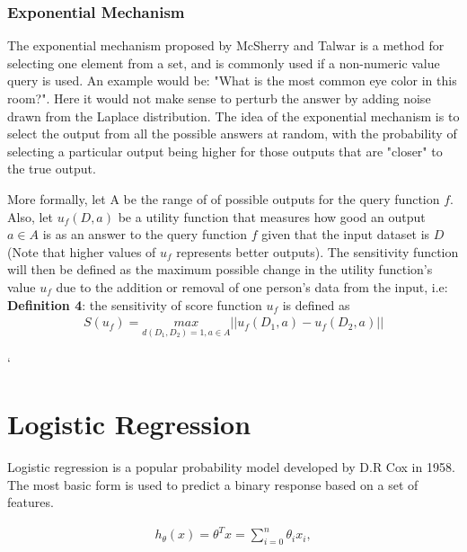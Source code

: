 \subsubsection{Exponential Mechanism}
The exponential mechanism proposed by McSherry and Talwar \cite{mcsherry2007} is a method for selecting one element from a set, and is commonly used if a non-numeric value query is used. An example would be: "What is the most common eye color in this room?". Here it would not make sense to perturb the answer by adding noise drawn from the Laplace distribution. The idea of the exponential mechanism is to select the output from all the possible answers at random, with the probability of selecting a particular output being higher for those outputs that are "closer" to the true output. 

More formally, let A be the range of of possible outputs for the query function $f$. Also, let $u_f(D,a)$ be a utility function that measures how good an output $a\in A$ is as an answer to the query function $f$ given that the input dataset is $D$ (Note that higher values of $u_f$ represents better outputs). The sensitivity function will then be defined as the maximum possible change in the utility function's value $u_f$ due to the addition or removal of one person's data from the input, i.e: \newline
\textbf{Definition 4}: the sensitivity of score function $u_f$ is defined as
\begin{eqnarray} \label{ExpoMecDef}
S(u_f) = \underset{d(D_1,D_2)=1,a\in A}{max}||u_f(D_1, a)-u_f(D_2,a)||
 \end{eqnarray}
 
 `
 \section{Logistic Regression}
 
 Logistic regression is a popular probability model developed by D.R Cox in 1958. The most basic form is used to predict a binary response based on a set of features.
 
 \begin{eqnarray} 
 h_{\theta}(x) = \theta^Tx = \sum_{i=0}^n \theta_i x_i, \nonumber
 \end{eqnarray}
 
